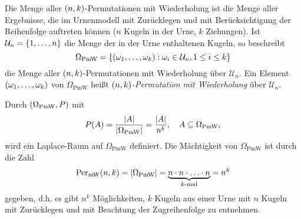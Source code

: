 \documentclass{lecture}
\begin{document}
    \begin{definition}
        Die Menge aller \(\parentheses*{n, k}\)-Permutationen mit Wiederholung ist die Menge aller Ergebnisse, die im Urnenmodell mit Zurücklegen und mit Berücksichtigung der Reihenfolge auftreten können (\(n\) Kugeln in der Urne, \(k\) Ziehungen).
        Ist \(\mathcal{U}_n = \braces*{1, \ldots, n}\) die Menge der in der Urne enthaltenen Kugeln, so beschreibt
        \[
            \Omega_{\text{PmW}} = \braces*{\parentheses*{\omega_1, \ldots, \omega_k} : \omega_i \in \mathcal{U}_n, 1 \le i \le k}
        \]
        die Menge aller \(\parentheses*{n, k}\)-Permutationen mit Wiederholung über \(\mathcal{U}_n\).
        Ein Element \(\parentheses*{\omega_1, \ldots, \omega_k}\) von \(\Omega_{\text{PmW}}\) heißt \emph{\(\parentheses*{n, k}\)-Permutation mit Wiederholung} über \(\mathcal{U}_n\).
    \end{definition}

    Durch \(\parentheses*{\Omega_{\text{PmW}}, P}\) mit
    \[
        P\parentheses*{A} = \frac{\absolute*{A}}{\absolute*{\Omega_{\text{PmW}}}} = \frac{\absolute*{A}}{n^k}, \quad A \subseteq \Omega_{\text{PmW}},
    \]
    wird ein Laplace-Raum auf \(\Omega_{\text{PmW}}\) definiert.
    Die Mächtigkeit von \(\Omega_{\text{PmW}}\) ist durch die Zahl
    \[
        \Per_{\text{mW}}\parentheses*{n, k} = \absolute*{\Omega_{\text{PmW}}} = \underbrace{n \cdot n \cdot \ldots \cdot n}_{k\text{-mal}} = n^k
    \]
    gegeben, d.h. es gibt \(n^k\) Möglichkeiten, \(k\) Kugeln aus einer Urne mit \(n\) Kugeln mit Zurücklegen und mit Beachtung der Zugreihenfolge zu entnehmen.
\end{document}

